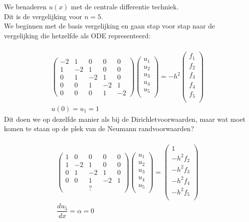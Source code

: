 \documentclass[11pt]{article}
\begin{document}
We benaderen $u(x)$ met de centrale differentie techniek.\\
Dit is de vergelijking voor $n = 5$.\\
We beginnen met de basis vergelijking en gaan stap voor stap naar de \\vergelijking die hetzelfde als ODE representeerd:\\\\
\begin{gather*}
\begin{pmatrix}
-2& 1 & 0 & 0 & 0 \\
1 & -2& 1 & 0 & 0 \\
0 & 1 & -2& 1 & 0 \\
0 & 0 & 1 & -2& 1 \\
0 & 0 & 0 & 1& -2 
\end{pmatrix}
%
\begin{pmatrix}
u_{1}\\
u_{2}\\
u_{3}\\
u_{4}\\
u_{5}\\
\end{pmatrix}
=
-h^2
\begin{pmatrix}
f_{1}\\
f_{2}\\
f_{3}\\
f_{4}\\
f_{5}\\
\end{pmatrix}\\
u(0)= u_{1} = 1 
\end{gather*}
Dit doen we op dezelfde manier als bij de Dirichletvoorwaarden, maar wat moet komen te staan op de plek van de Neumann randvoorwaarden?\\\\
\begin{gather*}
\begin{pmatrix}
1 & 0 & 0 & 0 & 0 \\
1 & -2& 1 & 0 & 0 \\
0 & 1 & -2& 1 & 0 \\
0 & 0 & 1 & -2& 1 \\
 &   & ? & &  
\end{pmatrix}
%
\begin{pmatrix}
u_{1}\\
u_{2}\\
u_{3}\\
u_{4}\\
u_{5}\\
\end{pmatrix}
=
\begin{pmatrix}
1\\
-h^2f_{2}\\
-h^2f_{3}\\
-h^2f_{4}\\
-h^2f_{5}\\
\end{pmatrix}\\
\dfrac{du_{5}}{dx} = \alpha = 0
\end{gather*}
\end{document}
